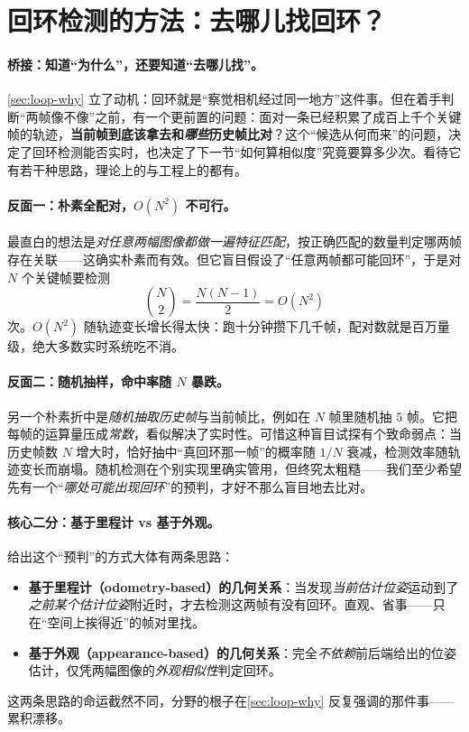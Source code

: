 \section{回环检测的方法：去哪儿找回环？}
\label{sec:loop-detect-methods}

\paragraph{桥接：知道“为什么”，还要知道“去哪儿找”。}
\cref{sec:loop-why} 立了动机：回环就是“察觉相机经过同一地方”这件事。但在着手判断“两帧像不像”之前，有一个更前置的问题：面对一条已经积累了成百上千个关键帧的轨迹，\textbf{当前帧到底该拿去和\emph{哪些}历史帧比对}？这个“候选从何而来”的问题，决定了回环检测能否实时，也决定了下一节“如何算相似度”究竟要算多少次。看待它有若干种思路，理论上的与工程上的都有\cite{gaoxiang2019slam14}。

\paragraph{反面一：朴素全配对，$O(N^2)$ 不可行。}
最直白的想法是\emph{对任意两幅图像都做一遍特征匹配}，按正确匹配的数量判定哪两帧存在关联——这确实朴素而有效\cite{gaoxiang2019slam14}。但它盲目假设了“任意两帧都可能回环”，于是对 $N$ 个关键帧要检测
\begin{equation}
  \binom{N}{2}=\frac{N(N-1)}{2}=O(N^2)
  \label{eq:loop-allpairs}
\end{equation}
次。$O(N^2)$ 随轨迹变长增长得太快：跑十分钟攒下几千帧，配对数就是百万量级，绝大多数实时系统吃不消。

\paragraph{反面二：随机抽样，命中率随 $N$ 暴跌。}
另一个朴素折中是\emph{随机抽取历史帧}与当前帧比，例如在 $N$ 帧里随机抽 $5$ 帧\cite{gaoxiang2019slam14}。它把每帧的运算量压成\emph{常数}，看似解决了实时性。可惜这种盲目试探有个致命弱点：当历史帧数 $N$ 增大时，恰好抽中“真回环那一帧”的概率随 $1/N$ 衰减，检测效率随轨迹变长而崩塌。随机检测在个别实现里确实管用\cite{lowry2016vpr}，但终究太粗糙——我们至少希望先有一个“\emph{哪处可能出现回环}”的预判，才好不那么盲目地去比对。

\paragraph{核心二分：基于里程计 vs 基于外观。}
给出这个“预判”的方式大体有两条思路\cite{gaoxiang2019slam14}：
\begin{itemize}
  \item \textbf{基于里程计（odometry-based）的几何关系}：当发现\emph{当前估计位姿}运动到了\emph{之前某个估计位姿}附近时，才去检测这两帧有没有回环。直观、省事——只在“空间上挨得近”的帧对里找。
  \item \textbf{基于外观（appearance-based）的几何关系}：完全\emph{不依赖}前后端给出的位姿估计，仅凭两幅图像的\emph{外观相似性}判定回环。
\end{itemize}
这两条思路的命运截然不同，分野的根子在\cref{sec:loop-why} 反复强调的那件事——累积漂移。

